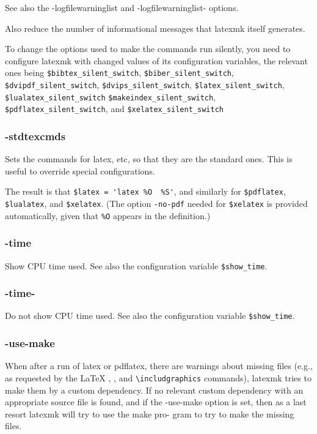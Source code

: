 See  also  the  -logfilewarninglist and -logfilewarninglist- options.

Also reduce the number of informational  messages  that  latexmk
itself generates.

To  change  the  options used to make the commands run silently, you need to
configure latexmk with changed values of its configuration    variables, the
relevant    ones   being   \verb|$bibtex_silent_switch|,
\verb|$biber_silent_switch|,  \verb|$dvipdf_silent_switch|,
\verb|$dvips_silent_switch|, \verb|$latex_silent_switch|,
\verb|$lualatex_silent_switch| \verb|$makeindex_silent_switch|,
\verb|$pdflatex_silent_switch|, and \verb|$xelatex_silent_switch|


\subsubsection{-stdtexcmds}

Sets  the commands for latex, etc, so that they are the standard
ones. This is useful to override special configurations.

The result is that \verb|$latex = 'latex %O  %S'|,  and  similarly  for
\verb|$pdflatex|,  \verb|$lualatex|, and \verb|$xelatex|.  (The option \verb|-no-pdf| needed
for \verb|$xelatex| is provided automatically, given that \verb|%O| appears in
the definition.)


\subsubsection{-time}

Show  CPU  time  used.   See  also  the  configuration  variable
\verb|$show_time|.


\subsubsection{-time-}

Do not show CPU time used.  See also the configuration  variable
\verb|$show_time|.


\subsubsection{-use-make}

When  after a run of latex or pdflatex, there are warnings about missing files
(e.g., as requested by the LaTeX \verb||, \verb||, and  \verb|\includgraphics|
commands), latexmk tries to make them by a custom dependency. If no relevant
custom dependency with an  appropriate  source  file is found, and if the
-use-make option is set, then as a last resort latexmk will try to use the make
pro- gram to try to make the missing files.

